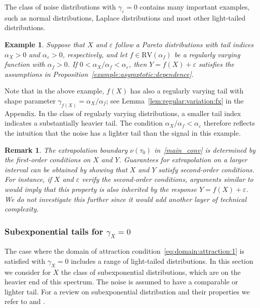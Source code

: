 \documentclass{statsoc}
\newtheorem{example}{Example}
\newtheorem{remark}{Remark}
\theoremstyle{break}
\newcommand{\eps}{\varepsilon}
\newcommand{\tauzero}{\tau_0}
\begin{document}
The class of noise distributions with $\gamma_\varepsilon =0$ contains many important examples, such as normal distributions, Laplace distributions and most other light-tailed distributions.




\begin{example}
	Suppose that $X$ and $\eps$ follow a Pareto distributions  
	with tail indices $\alpha_X>0$ and $\alpha_\varepsilon>0$, respectively, and let 
	$f\in\text{RV}(\alpha_f)$ be a regularly varying function with $\alpha_f >0$. 
	If $ 0< \alpha_X/\alpha_f < \alpha_\varepsilon$, then $Y= f(X) + \varepsilon$ 
	satisfies the assumptions in Proposition~\ref{example:asymptotic:dependence}.
\end{example}

Note that in the above example, $f(X)$ has also a regularly varying tail with shape
 parameter
 $\gamma_{f(X)} = \alpha_X / \alpha_f$; see Lemma~\ref{lem:regular:variation:fx} 
 in the Appendix.
  In the class of regularly varying distributions, 
  a smaller tail index indicates a substantially heavier tail.
   The condition $\alpha_X/\alpha_f < \alpha_\varepsilon$ therefore reflects 
   the intuition that the noise has a lighter tail than the signal in this example.


 \begin{remark}
	The extrapolation boundary $\nu(\tauzero)$ in~\eqref{main_conv} is determined by the first-order conditions on $X$ and $Y$. Guarantees for extrapolation on a larger interval can be obtained  by showing that $X$ and $Y$ satisfy second-order conditions.
	For instance, if $X$ and $\varepsilon$ verify the second-order conditions, arguments similar to \cite{geluk:dehaan:resnick:starica,geluk:peng:vries:casper:2000}
	would imply that this property is also inherited by the response $Y= f(X) + \varepsilon$.
	We do not investigate this further since it would add another layer of technical complexity.
 \end{remark}
 
 
 \subsubsection{Subexponential tails for $\gamma_X = 0$}\label{sec:gumbel:subexponential}

The case where the domain of attraction condition~\eqref{eq:domain:attraction:1}  is satisfied with $\gamma_X=0$ includes a range of light-tailed distributions. In this section we consider for $X$ the class of subexponential distributions, which are on the heavier end of this spectrum.
The noise is assumed to have a comparable or lighter tail. For a review on subexponential distribution and their properties we refer to \cite{embrechts:kluppelberg:mikosch:2013} and \cite{cline:1986}. 
\end{document}
